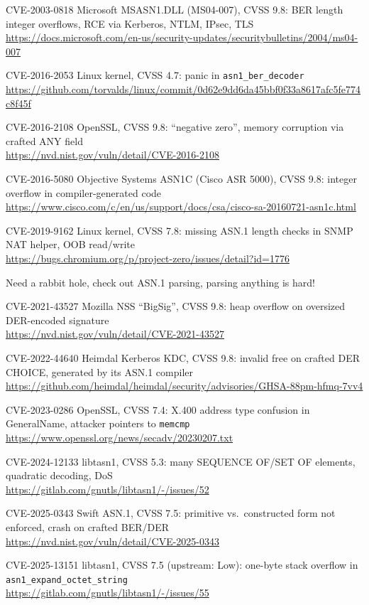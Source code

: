 \documentclass[Screen16to9,17pt]{foils}
\begin{document}
\begin{list2}
\item CVE-2003-0818 Microsoft MSASN1.DLL (MS04-007), CVSS 9.8:
      BER length integer overflows, RCE via Kerberos, NTLM, IPsec, TLS\\
\url{https://docs.microsoft.com/en-us/security-updates/securitybulletins/2004/ms04-007}
\item CVE-2016-2053 Linux kernel, CVSS 4.7: panic in \verb+asn1_ber_decoder+\\
\url{https://github.com/torvalds/linux/commit/0d62e9dd6da45bbf0f33a8617afc5fe774c8f45f}
\item CVE-2016-2108 OpenSSL, CVSS 9.8: ``negative zero'',
      memory corruption via crafted ANY field\\
\url{https://nvd.nist.gov/vuln/detail/CVE-2016-2108}
\item CVE-2016-5080 Objective Systems ASN1C (Cisco ASR 5000), CVSS 9.8:
      integer overflow in compiler-generated code\\
      \url{https://www.cisco.com/c/en/us/support/docs/csa/cisco-sa-20160721-asn1c.html}
\item CVE-2019-9162 Linux kernel, CVSS 7.8: missing ASN.1 length checks
      in SNMP NAT helper, OOB read/write\\
      \url{https://bugs.chromium.org/p/project-zero/issues/detail?id=1776}
\end{list2}

Need a rabbit hole, check out ASN.1 parsing, parsing anything is hard!


\begin{list2}
\item CVE-2021-43527 Mozilla NSS ``BigSig'', CVSS 9.8: heap overflow on
      oversized DER-encoded signature\\
      \url{https://nvd.nist.gov/vuln/detail/CVE-2021-43527}
\item CVE-2022-44640 Heimdal Kerberos KDC, CVSS 9.8: invalid free on
      crafted DER CHOICE, generated by its ASN.1 compiler
      \url{https://github.com/heimdal/heimdal/security/advisories/GHSA-88pm-hfmq-7vv4}
\item CVE-2023-0286 OpenSSL, CVSS 7.4: X.400 address type confusion
      in GeneralName, attacker pointers to \verb+memcmp+\\
      \url{https://www.openssl.org/news/secadv/20230207.txt}
\item CVE-2024-12133 libtasn1, CVSS 5.3: many SEQUENCE OF/SET OF
      elements, quadratic decoding, DoS\\
      \url{https://gitlab.com/gnutls/libtasn1/-/issues/52}
\item CVE-2025-0343 Swift ASN.1, CVSS 7.5: primitive vs.\ constructed
      form not enforced, crash on crafted BER/DER\\
      \url{https://nvd.nist.gov/vuln/detail/CVE-2025-0343}
\item CVE-2025-13151 libtasn1, CVSS 7.5 (upstream: Low): one-byte
      stack overflow in \verb+asn1_expand_octet_string+\\
      \url{https://gitlab.com/gnutls/libtasn1/-/issues/55}
\end{list2}
\end{document}
